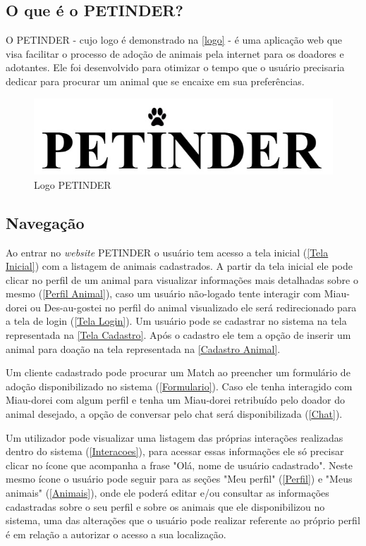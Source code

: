 \begin{apendicesenv}
\begin{flushleft}
\section{O que é o PETINDER?}
O PETINDER - cujo logo é demonstrado na \autoref{logo} - é uma aplicação web que visa facilitar o processo de adoção de animais pela internet para os doadores e adotantes. Ele foi desenvolvido para otimizar o tempo que o usuário precisaria dedicar para procurar um animal que se encaixe em sua preferências.
\begin{figure}[!htbp]
    \centering
    \caption{\label{logo}Logo PETINDER}
	\includegraphics[scale=0.80,angle=0]{imagens/Logo.jpg}
\end{figure}
\end{flushleft}

\begin{flushleft}
\section{Navegação}
Ao entrar no \textit{website} PETINDER o usuário tem acesso a tela inicial (\autoref{Tela Inicial}) com a listagem de animais cadastrados. A partir da tela inicial ele pode clicar no perfil de um animal para visualizar informações mais detalhadas sobre o mesmo (\autoref{Perfil Animal}), caso um usuário não-logado tente interagir com \gls{Miau-dorei} ou \gls{Des-au-gostei} no perfil do animal visualizado ele será redirecionado para a tela de login (\autoref{Tela Login}). Um usuário pode se cadastrar no sistema na tela representada na \autoref{Tela Cadastro}. Após o cadastro ele tem a opção de inserir um animal para doação na tela representada na \autoref{Cadastro Animal}. 

Um cliente cadastrado pode procurar um \gls{Match} ao preencher um formulário de adoção disponibilizado no sistema (\autoref{Formulario}). Caso ele tenha interagido com \gls{Miau-dorei} com algum perfil e tenha um \gls{Miau-dorei} retribuído pelo doador do animal desejado, a opção de conversar pelo chat será disponibilizada (\autoref{Chat}).

Um utilizador pode visualizar uma listagem das próprias interações realizadas dentro do sistema (\autoref{Interacoes}), para acessar essas informações ele só precisar clicar no ícone que acompanha a frase "Olá, nome de usuário cadastrado". Neste mesmo ícone o usuário pode seguir para as seções "Meu perfil" (\autoref{Perfil}) e "Meus animais" (\autoref{Animais}), onde ele poderá editar e/ou consultar as informações cadastradas sobre o seu perfil e sobre os animais que ele disponibilizou no sistema, uma das alterações que o usuário pode realizar referente ao próprio perfil é em relação a autorizar o acesso a sua localização.


\end{flushleft}
\end{apendicesenv}
